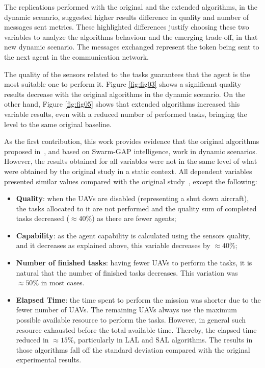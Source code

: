 The replications performed with the original and the extended algorithms, in the dynamic scenario, suggested higher results difference in quality and number of messages sent metrics. These highlighted differences justify choosing these two variables to analyze the algorithms behaviour and the emerging trade-off, in that new dynamic scenario. The messages exchanged represent the token being sent to the next agent in the communication network.

The quality of the sensors related to the tasks guarantees that the agent is the most suitable one to perform it. Figure \ref{fig:fig03} shows a significant quality results decrease with the original algorithms in the dynamic scenario. On the other hand, Figure \ref{fig:fig05} shows that extended algorithms increased this variable results, even with a reduced number of performed tasks, bringing the level to the same original baseline. 

As the first contribution, this work provides evidence that the original algorithms proposed in~\cite{MAS07}, and based on Swarm-GAP intelligence, work in dynamic scenarios. However, the results obtained for all variables were not in the same level of what were obtained by the original study in a static context. All dependent variables presented similar values compared with the original study~\cite{MAS07}, except the following:

\begin{itemize}
   \item \textbf{Quality}: when the UAVs are disabled (representing a shut down aircraft), the tasks allocated to it are not performed and the quality sum of completed tasks decreased ($\approx 40\%$) as there are fewer agents;
   \item \textbf{Capability}: as the agent capability is calculated using the sensors quality,  and it decreases as explained above, this variable decreases by $\approx 40\%$;
   \item \textbf{Number of finished tasks}: having fewer UAVs to perform the tasks, it is natural that the number of finished tasks decreases. This variation was $\approx 50\%$ in most cases.
   \item \textbf{Elapsed Time}: the time spent to perform the mission was shorter due to the fewer number of UAVs. The remaining UAVs always use the maximum possible available resource to perform the tasks. However, in general such resource exhausted before the total available time. Thereby, the elapsed time reduced in $\approx 15\%$, particularly in LAL and SAL algorithms. The results in those algorithms fall off the standard deviation compared with the original experimental results.
\end{itemize}

